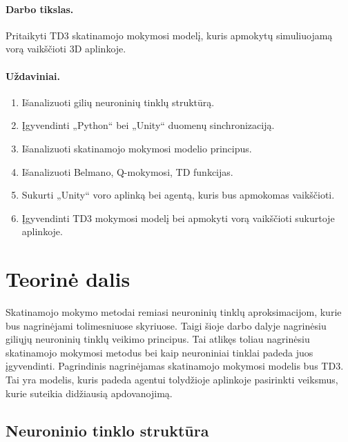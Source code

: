 \documentclass[a4paper, 12pt]{article}
\begin{document}
\paragraph{Darbo tikslas.} Pritaikyti TD3 skatinamojo mokymosi modelį, kuris apmokytų simuliuojamą vorą vaikščioti 3D aplinkoje.
%
\paragraph{Uždaviniai.}
%
\begin{enumerate}
  \addtolength{\itemsep}{-0.5\baselineskip} 
  \item Išanalizuoti gilių neuroninių tinklų struktūrą.
  \item Įgyvendinti „Python“ bei „Unity“ duomenų sinchronizaciją.
  \item Išanalizuoti skatinamojo mokymosi modelio principus.
  \item Išanalizuoti Belmano, Q-mokymosi, TD funkcijas.
  \item Sukurti „Unity“ voro aplinką bei agentą, kuris bus apmokomas vaikščioti.
  \item Įgyvendinti TD3 mokymosi modelį bei apmokyti vorą vaikščioti sukurtoje aplinkoje.
\end{enumerate}


%
%
\newpage



\section{Teorinė dalis}
%

Skatinamojo mokymo metodai remiasi neuroninių tinklų aproksimacijom, kurie bus nagrinėjami tolimesniuose skyriuose. Taigi šioje darbo dalyje nagrinėsiu giliųjų neuroninių tinklų veikimo principus. Tai atlikęs toliau nagrinėsiu skatinamojo mokymosi metodus bei kaip neuroniniai tinklai padeda juos įgyvendinti. Pagrindinis nagrinėjamas skatinamojo mokymosi modelis bus TD3. Tai yra modelis, kuris padeda agentui tolydžioje aplinkoje pasirinkti veiksmus, kurie suteikia didžiausią apdovanojimą. 


%
\subsection{Neuroninio tinklo struktūra}
%
\end{document}
